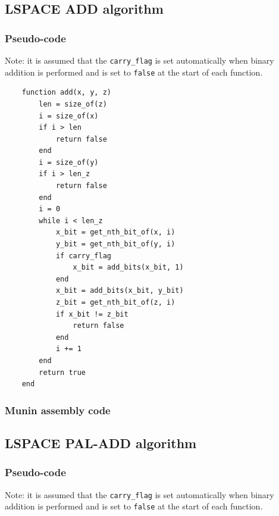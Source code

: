 \documentclass[11pt, a4paper]{article}
\begin{document}


\subsection{LSPACE ADD algorithm}

\subsubsection{Pseudo-code}

Note: it is assumed that the \lstinline|carry_flag| is set automatically when binary addition is performed and is set to \lstinline|false| at the start of each function.

\begin{lstlisting}
    function add(x, y, z)
        len = size_of(z)
        i = size_of(x)
        if i > len
            return false
        end
        i = size_of(y)
        if i > len_z
            return false
        end
        i = 0
        while i < len_z
            x_bit = get_nth_bit_of(x, i)
            y_bit = get_nth_bit_of(y, i)
            if carry_flag
                x_bit = add_bits(x_bit, 1)
            end
            x_bit = add_bits(x_bit, y_bit)
            z_bit = get_nth_bit_of(z, i)
            if x_bit != z_bit
                return false
            end
            i += 1
        end
        return true
    end
\end{lstlisting}

\subsubsection{Munin assembly code}



\subsection{LSPACE PAL-ADD algorithm}

\subsubsection{Pseudo-code}

Note: it is assumed that the \lstinline|carry_flag| is set automatically when binary addition is performed and is set to \lstinline|false| at the start of each function.
\end{document}
